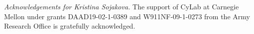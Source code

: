 \documentclass[10pt,a4paper,oneside,reqno]{amsart}
\numberwithin{equation}{section}
\theoremstyle{mythm}
\theoremstyle{mydef}
\theoremstyle{myrmk}
\begin{document}
\smallskip

\noindent
\emph{Acknowledgements for Kristina Sojakova.} The support of CyLab at Carnegie
Mellon under grants DAAD19-02-1-0389 and W911NF-09-1-0273 from the Army
Research Office is gratefully acknowledged.











                        
\end{document}
